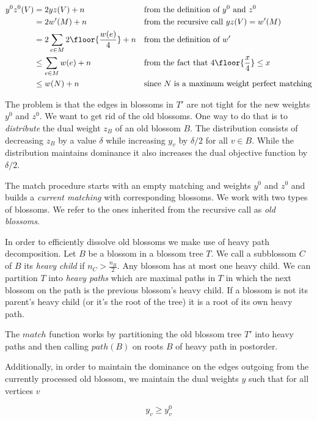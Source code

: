 \begin{align*}
    y^0z^0(V) &= 2yz(V) + n && \text{from the definition of $y^0$ and $z^0$}\\
    &= 2w'(M) + n && \text{from the recursive call $yz(V) = w'(M)$} \\
    &= 2 \sum_{e \in M} 2 \floor{\frac{w(e)}{4}} + n && \text{from the definition of $w'$} \\
    &\leq \sum_{e \in M} w(e) + n && \text{from the fact that $4\floor{\frac{x}{4}} \leq x$} \\
    &\leq w(N) + n  && \text{since $N$ is a maximum weight perfect matching} \\
\end{align*}

The problem is that the edges in blossoms in $T'$ are not tight for the new weights $y^0$ and $z^0$. We want to get rid of the old blossoms. One way to do that is to \textit{distribute} the dual weight $z_B$ of an old blossom $B$. The distribution consists of decreasing $z_B$ by a value $\delta$ while increasing $y_v$ by $\delta / 2$ for all $v \in B$. While the distribution maintains dominance it also increases the dual objective function by $\delta / 2$. 

The match procedure starts with an empty matching and weights $y^0$ and $z^0$ and builds a \textit{current matching} with corresponding blossoms. We work with two types of blossoms. We refer to the ones inherited from the recursive call as \textit{old blossoms}.

In order to efficiently dissolve old blossoms we make use of heavy path decomposition. Let $B$ be a blossom in a blossom tree $T$. We call a subblossom $C$ of $B$ its \textit{heavy child} if $n_C > \frac{n_B}{2}$. Any blossom has at most one heavy child. We can partition $T$ into \textit{heavy paths} which are maximal paths in $T$ in which the next blossom on the path is the previous blossom's heavy child. If a blossom is not its parent's heavy child (or it's the root of the tree) it is a root of its own heavy path.

The $match$ function works by partitioning the old blossom tree $T'$ into heavy paths and then calling $path(B)$ on roots $B$ of heavy path in postorder.

Additionally, in order to maintain the dominance on the edges outgoing from the currently processed old blossom, we maintain the dual weights $y$ such that for all vertices $v$

\begin{equation}\label{eq:4}
    y_v \geq y^0_v
\end{equation}

